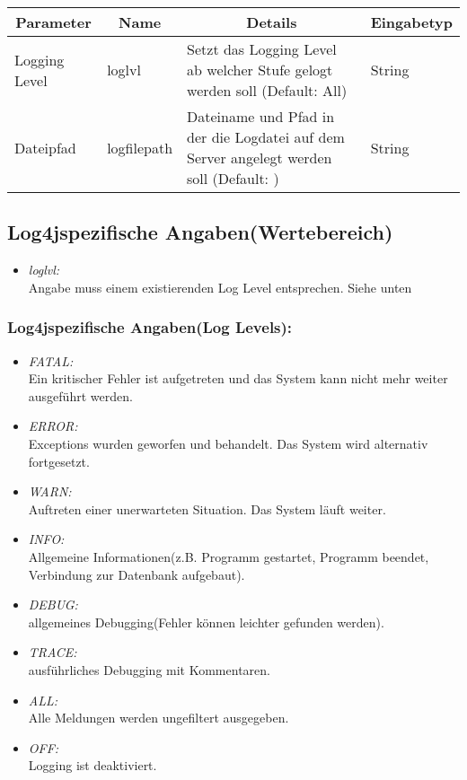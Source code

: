 \begin{center}
	\begin{longtable}{|p{4cm} | p{3cm}| p{7cm} | p{2cm} |}
	\hline
	\multicolumn{1}{|c|}{\textbf{Parameter}} & \multicolumn{1}{c|}{\textbf{Name}} & \multicolumn{1}{c|}{\textbf{Details}} & \multicolumn{1}{c|}{\textbf{Eingabetyp}}
	\\ \hline
	Logging Level & loglvl & Setzt das Logging Level ab welcher Stufe gelogt werden soll (Default: All) & String \\ \hline
	Dateipfad & logfilepath & Dateiname und Pfad in der die Logdatei auf dem Server angelegt werden soll (Default: ) & String \\ \hline
	
\end{longtable}

\end{center}

\subsection{Log4jspezifische Angaben(Wertebereich)}

\begin{itemize}
	\item \emph{loglvl:}\\
	Angabe muss einem existierenden Log Level entsprechen. Siehe unten
\end{itemize}

\subsubsection{Log4jspezifische Angaben(Log Levels):}

\begin{itemize}
	\item \emph{FATAL:}\\
	Ein kritischer Fehler ist aufgetreten und das System kann nicht mehr weiter ausgeführt werden.
	\item \emph{ERROR:}\\
	Exceptions wurden geworfen und behandelt. Das System wird alternativ fortgesetzt.
	\item \emph{WARN:}\\
	Auftreten einer unerwarteten Situation. Das System läuft weiter.
	\item \emph{INFO:}\\
	Allgemeine Informationen(z.B. Programm gestartet, Programm beendet, Verbindung zur Datenbank aufgebaut).
	\item \emph{DEBUG:}\\
	allgemeines Debugging(Fehler können leichter gefunden werden).
	\item \emph{TRACE:}\\
	ausführliches Debugging mit Kommentaren.
	\item \emph{ALL:}\\
	Alle Meldungen werden ungefiltert ausgegeben.
	\item \emph{OFF:}\\
	Logging ist deaktiviert.
\end{itemize}


